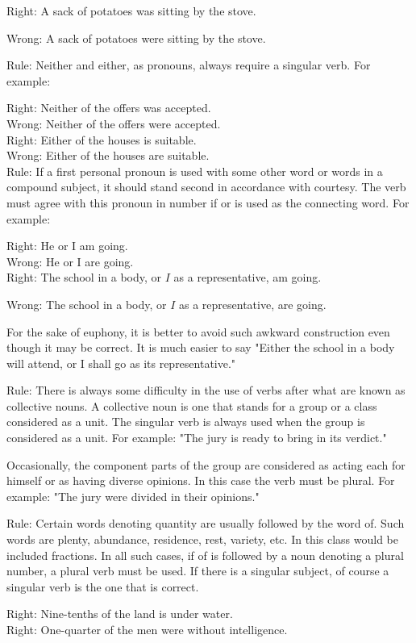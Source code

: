 \documentclass[10pt]{article}
\begin{document}
Right: A sack of potatoes was sitting by the stove.

Wrong: A sack of potatoes were sitting by the stove.

Rule: Neither and either, as pronouns, always require a singular verb. For example:

Right: Neither of the offers was accepted.\\
Wrong: Neither of the offers were accepted.\\
Right: Either of the houses is suitable.\\
Wrong: Either of the houses are suitable.\\
Rule: If a first personal pronoun is used with some other word or words in a compound subject, it should stand second in accordance with courtesy. The verb must agree with this pronoun in number if or is used as the connecting word. For example:

Right: He or I am going.\\
Wrong: He or I are going.\\
Right: The school in a body, or $I$ as a representative, am going.

Wrong: The school in a body, or $I$ as a representative, are going.

For the sake of euphony, it is better to avoid such awkward construction even though it may be correct. It is much easier to say "Either the school in a body will attend, or I shall go as its representative."

Rule: There is always some difficulty in the use of verbs after what are known as collective nouns. A collective noun is one that stands for a group or a class considered as a unit. The singular verb is always used when the group is considered as a unit. For example: "The jury is ready to bring in its verdict."

Occasionally, the component parts of the group are considered as acting each for himself or as having diverse opinions. In this case the verb must be plural. For example: "The jury were divided in their opinions."

Rule: Certain words denoting quantity are usually followed by the word of. Such words are plenty, abundance, residence, rest, variety, etc. In this class would be included fractions. In all such cases, if of is followed by a noun denoting a plural number, a plural verb must be used. If there is a singular subject, of course a singular verb is the one that is correct.

Right: Nine-tenths of the land is under water.\\
Right: One-quarter of the men were without intelligence.
\end{document}
